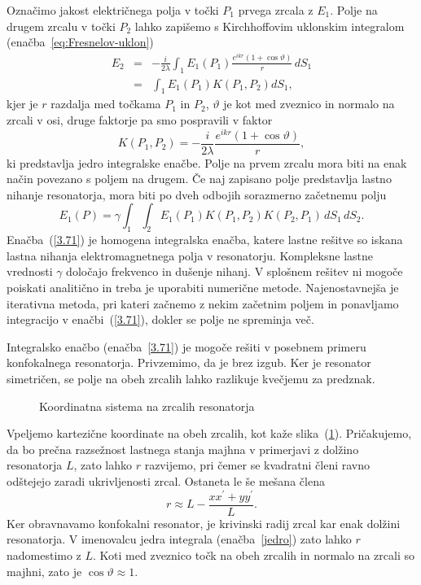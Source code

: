Označimo jakost električnega polja v točki $P_{1}$ prvega zrcala z $E_{1}$.
Polje na drugem zrcalu v točki $P_2$ lahko zapišemo s Kirchhoffovim uklonskim
integralom (enačba~\ref{eq:Fresnelov-uklon})
\begin{eqnarray}
E_{2} & = & -\frac{i}{2\lambda}\int_{1}E_{1}(P_{1})\frac{e^{ikr}(1+\cos\vartheta)}{r}\, dS_{1} \\
 & = & \int_{1}E_{1}(P_{1})K(P_{1},P_{2})dS_{1},
\label{eq:resuklon}
\end{eqnarray}
kjer je $r$ razdalja med točkama $P_{1}$ in $P_{2}$, $\vartheta$
je kot med zveznico in normalo na zrcali v osi, druge faktorje pa smo pospravili v faktor
\begin{equation}
K(P_{1},P_{2}) = -\frac{i}{2\lambda}\frac{e^{ikr}(1+\cos\vartheta)}{r},
\label{jedro}
\end{equation}
ki predstavlja jedro integralske enačbe. Polje na prvem zrcalu mora
biti na enak način povezano s poljem na drugem. Če naj zapisano polje predstavlja lastno nihanje
resonatorja, mora biti po dveh odbojih sorazmerno začetnemu polju
\begin{equation}
E_{1}(P)=\gamma\int_{1}\int_{2}E_{1}(P_{1})K(P_{1},P_{2})K(P_{2},P_1)\, dS_{1}\, dS_{2}.
\label{3.71}
\end{equation}
Enačba~(\ref{3.71}) je homogena integralska enačba, katere lastne
rešitve so iskana lastna nihanja elektromagnetnega polja v resonatorju.
Kompleksne lastne vrednosti $\gamma$ določajo frekvenco in dušenje
nihanj. V splošnem rešitev ni mogoče poiskati analitično in treba je uporabiti 
numerične metode. Najenostavnejša je iterativna
metoda, pri kateri začnemo z nekim začetnim poljem in ponavljamo integracijo
v enačbi~(\ref{3.71}), dokler se polje ne spreminja več.

Integralsko enačbo (enačba~\ref{3.71}) je mogoče rešiti v posebnem primeru
konfokalnega resonatorja. Privzemimo, da je brez izgub. 
Ker je resonator simetričen, se polje na obeh zrcalih lahko razlikuje kvečjemu
za predznak.
\begin{figure}[h]
\centering
\def\svgwidth{110truemm} 

\caption{Koordinatna sistema na zrcalih resonatorja}
\label{fig:uklon_res_shema}
\end{figure}
Vpeljemo kartezične koordinate na obeh zrcalih, kot kaže slika~(\ref{fig:uklon_res_shema}).
Pričakujemo, da bo prečna razsežnost lastnega stanja majhna v primerjavi
z dolžino resonatorja $L$, zato lahko $r$ razvijemo, pri čemer se kvadratni členi ravno odštejejo 
zaradi ukrivljenosti zrcal. Ostaneta le še mešana člena
\begin{equation}
r\approx L-\frac{xx^{\prime}+yy^{\prime}}{L}.
\label{3.72}
\end{equation}
Ker obravnavamo konfokalni resonator, je krivinski radij zrcal kar enak dolžini resonatorja.
V imenovalcu jedra integrala (enačba~\ref{jedro}) zato lahko $r$ nadomestimo
z $L$. Koti med zveznico točk na obeh zrcalih in normalo na zrcali
so majhni, zato je  $\cos\vartheta \approx 1$. 

